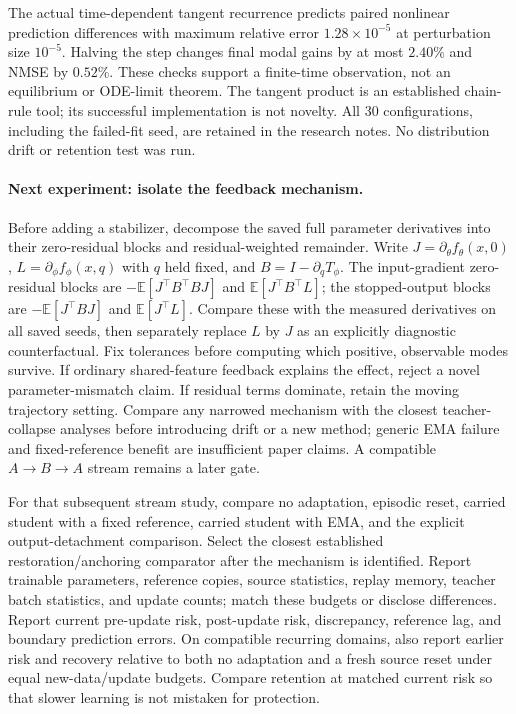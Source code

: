 \documentclass[11pt,a4paper]{article}
\newcommand{\E}{\mathbb{E}}
\begin{document}
The actual time-dependent tangent recurrence predicts paired nonlinear
prediction differences with maximum relative error $1.28\times10^{-5}$
at perturbation size $10^{-5}$. Halving the step changes final modal gains
by at most $2.40\%$ and NMSE by $0.52\%$. These checks support a finite-time
observation, not an equilibrium or ODE-limit theorem. The tangent product
is an established chain-rule tool; its successful implementation is not
novelty. All 30 configurations, including the failed-fit seed, are retained
in the research notes. No distribution drift or retention test was run.

\paragraph{Next experiment: isolate the feedback mechanism.}
Before adding a stabilizer, decompose the saved full parameter derivatives
into their zero-residual blocks and residual-weighted remainder. Write
$J=\partial_\theta f_\theta(x,0)$,
$L=\partial_\phi f_\phi(x,q)$ with $q$ held fixed, and
$B=I-\partial_qT_\phi$. The input-gradient zero-residual blocks are
$-\E[J^\top B^\top BJ]$ and $\E[J^\top B^\top L]$; the stopped-output
blocks are $-\E[J^\top BJ]$ and $\E[J^\top L]$.
Compare these with the measured derivatives on all saved seeds, then
separately replace $L$ by $J$ as an explicitly diagnostic counterfactual.
Fix tolerances before computing which positive, observable modes survive.
If ordinary shared-feature feedback explains the effect, reject a novel
parameter-mismatch claim. If residual terms dominate, retain the moving
trajectory setting. Compare any narrowed mechanism with the closest
teacher-collapse analyses before introducing drift or a new method;
generic EMA failure and fixed-reference benefit are insufficient paper
claims. A compatible $A\to B\to A$ stream remains a later gate.

For that subsequent stream study, compare no adaptation, episodic reset,
carried student with a fixed
reference, carried student with EMA, and the explicit output-detachment
comparison. Select the closest established restoration/anchoring comparator
after the mechanism is identified. Report trainable parameters, reference
copies, source statistics, replay memory, teacher batch statistics, and
update counts; match these budgets or disclose differences. Report current
pre-update risk, post-update risk, discrepancy, reference lag, and boundary
prediction errors. On compatible recurring domains, also report earlier
risk and recovery relative to both no adaptation and a fresh source reset
under equal new-data/update budgets. Compare retention at matched current
risk so that slower learning is not mistaken for protection.
\end{document}
